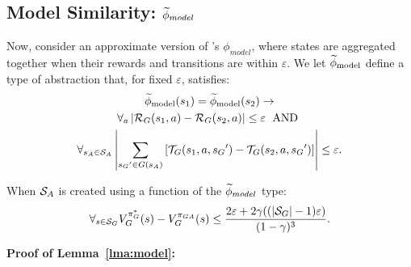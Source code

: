 \subsection{Model Similarity: $\widetilde \phi_{model}$}
\label{sec:model}

Now, consider an approximate version of \citet{li2006towards}'s $\phi_{model}$, where states are aggregated together when their rewards and transitions are within $\varepsilon$.
\bdefn{$\epM$}
We let $\epM$ define a type of abstraction that, for fixed $\varepsilon$, satisfies:
\begin{multline}
\widetilde \phi_{\text{model}}(s_1) = \widetilde \phi_{\text{model}}(s_2) \rightarrow \\
\forall_a \left| \mathcal{R}_G(s_1, a) - \mathcal{R}_G(s_2, a)\right| \leq \varepsilon\; \text{~AND}\ \\
\forall_{s_A \in \mathcal{S}_A} \left|\sum_{{s_G}' \in G(s_A)} \left[\mathcal{T}_G(s_1, a, {s_G}') - \mathcal{T}_G(s_2, a,{s_G}')\right] \right| \leq \varepsilon.
\end{multline}
\edefn

\begin{lma}
\label{lma:model}
When $\mathcal{S}_A$ is created using a function of the $\widetilde \phi_{model}$ type:
\begin{equation}
\forall_{s \in \mathcal{S}_G} V_G^{\pi_G^*}(s) - V_G^{\pi_{GA}}(s) \leq \frac{2\varepsilon + 2\gamma((|\mathcal{S}_G|-1)\varepsilon)}{(1-\gamma)^3}.
\end{equation}
\end{lma}

{\bf Proof of Lemma~\ref{lma:model}:}

